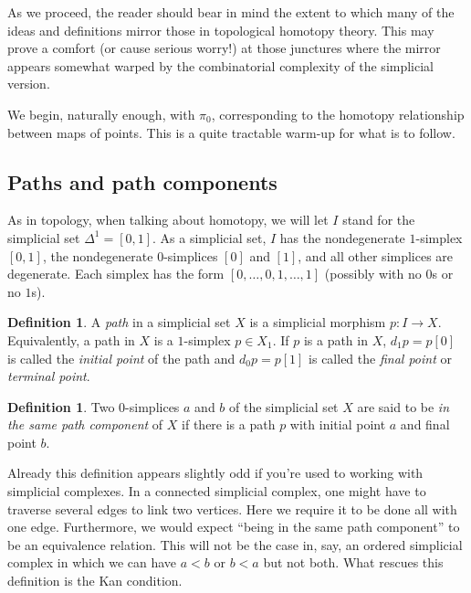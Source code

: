 \documentclass[12pt]{article}
\theoremstyle{plain}
\theoremstyle{definition}
\newtheorem{definition}[theorem]{Definition}
\begin{document}
As we proceed, the reader should bear in mind the extent to which many of the ideas and definitions mirror those in topological homotopy theory. This may prove a comfort (or cause serious worry!) at those junctures where the mirror appears somewhat warped by the combinatorial complexity of the simplicial version.

We begin, naturally enough, with $\pi_0$, corresponding to the homotopy relationship between maps of points. This is a quite tractable warm-up for what is to follow.

\subsection{Paths and path components}

As in topology, when talking about homotopy, we will let $I$ stand for the simplicial set $\Delta^1=[0,1]$. As a simplicial set, $I$ has the nondegenerate $1$-simplex $[0,1]$, the nondegenerate $0$-simplices $[0]$ and $[1]$, and all other simplices are degenerate. Each simplex has the form $[0,\ldots,0,1,\ldots, 1]$ (possibly with no $0$s or no $1$s). 

\begin{definition}
A \emph{path} in a simplicial set $X$ is a simplicial morphism $p\colon I\to X$. Equivalently, a path in $X$ is a $1$-simplex $p\in X_1$. If $p$ is a path in $X$, $d_1p=p[0]$ is called the \emph{initial point} of the path and $d_0p=p[1]$ is called the \emph{final point} or \emph{terminal point}. 
\end{definition}



\begin{definition}
Two $0$-simplices $a$ and $b$ of the simplicial set $X$ are said to be \emph{in the same path component} of $X$ if there is a path $p$ with initial point $a$ and final point $b$.
\end{definition}

Already this definition appears slightly odd if you're used to working with simplicial complexes. In a connected simplicial complex, one might have to traverse several edges to link two vertices. Here we require it to be done all with one edge. Furthermore, we would expect ``being in the same path component'' to be an equivalence relation. This will not be the case in, say, an ordered simplicial complex in which we can have $a<b$ or $b<a$ but not both. What rescues this definition is the Kan condition.
\end{document}
